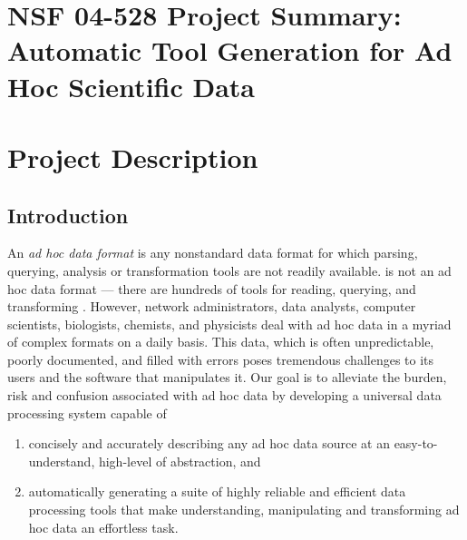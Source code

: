 \documentclass[11pt]{article}
\begin{document}
\setcounter{page}{1}
\appendix
\section{NSF 04-528 Project Summary:  \\
Automatic Tool Generation for Ad Hoc Scientific Data}

\newpage
\setcounter{page}{1}
\section{Project Description}

\subsection{Introduction}
\label{ssec:intro}

An {\em ad hoc data format} is any nonstandard data format for which
parsing, querying, analysis or transformation tools are not readily
available.  \xml{} is not an ad hoc data format --- there are hundreds
of tools for reading, querying, and transforming \xml{}.  However,
network administrators,
data analysts, computer scientists,
biologists, chemists, and physicists deal with ad hoc
data in a myriad of complex formats on a daily basis.
This data, which is often unpredictable, poorly documented,
and filled with errors
poses tremendous challenges to its users and the software
that manipulates it.  
Our goal is to alleviate the burden, risk and confusion associated
with ad hoc data by developing a universal data processing system
capable of 

\begin{enumerate}
\item concisely and accurately describing any ad hoc data source at an 
easy-to-understand, high-level of abstraction, and
\item automatically generating a suite of highly reliable and
efficient data processing tools that make understanding, manipulating 
and transforming ad hoc data an effortless task.
\end{enumerate}
\end{document}
